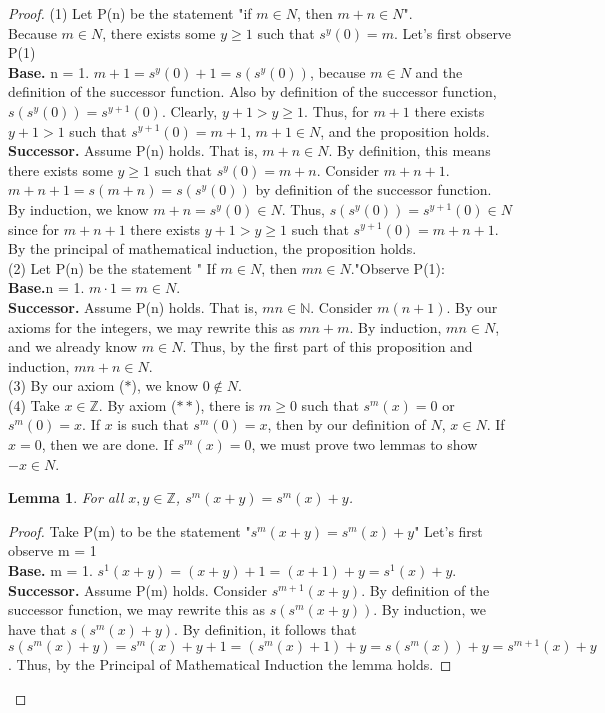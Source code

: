 \documentclass[12pt]{amsart}
\newcommand{\N}{\mathbb{N}}
\newcommand{\Z}{\mathbb{Z}}
\begin{document}
\begin{proof}
	(1) Let P(n) be the statement "if $m \in N$, then $m + n \in N$".\\Because $m \in N$, there exists some $y \geq 1$ such that $ s^y(0) = m$. Let's first observe P(1)
	\\\textbf{Base.} n = 1. $m + 1 = s^y(0) + 1 = s(s^y(0))$, because $m \in N$ and the definition of the successor function. Also by definition of the successor function, $s(s^y(0)) = s^{y+1}(0)$. Clearly, $y+1 > y \geq 1$. Thus, for $m+1$ there exists $y+1 > 1$ such that $s^{y+1}(0) = m+1$, $m+1 \in N$, and the proposition holds.
	\\\textbf{Successor.} Assume P(n) holds. That is, $m + n \in N$. By definition, this means there exists some $y \geq 1$ such that $s^y(0) = m+n$. Consider $m + n + 1$. $m + n + 1 = s(m + n) = s(s^y(0))$ by definition of the successor function. By induction, we know $m + n = s^y(0) \in N$. Thus, $s(s^{y}(0)) = s^{y+1}(0) \in N$ since for $m + n + 1$ there exists $y + 1 > y \geq 1$ such that $s^{y+1}(0) = m + n + 1$. By the principal of mathematical induction, the proposition holds.
	\\\indent (2) Let P(n) be the statement " If $m \in N$, then $mn \in N$."Observe P(1):
	\\\textbf{Base.}n = 1. $m \cdot 1 = m \in N$.
	\\\textbf{Successor.} Assume P(n) holds. That is, $mn \in \N$. Consider $m(n+1)$. By our axioms for the integers, we may rewrite this as $mn + m$. By induction, $mn \in N$, and we already know $m \in N$. Thus, by the first part of this proposition and induction, $mn + n \in N$.
	\\\indent (3) By our axiom ($\ast$), we know $0 \notin N$.
	\\\indent (4) Take $x \in \Z$. By axiom ($\ast\ast$), there is $m \geq 0$ such that $s^m(x) = 0$ or $s^m(0) = x$. If $x$ is such that $s^m(0) = x$, then by our definition of $N$, $x \in N$. If $x = 0$, then we are done. If $s^m(x) = 0$, we must prove two lemmas to show $-x \in N$.
	\newtheorem*{lemma1}{Lemma}
	\begin{lemma1}
		For all $x,y \in \Z$, $s^m(x+y) = s^m(x) + y$.
	\end{lemma1}
	\begin{proof}
		Take P(m) to be the statement "$s^m(x+y) = s^m(x) + y$" Let's first observe m = 1
		\\\textbf{Base.} m = 1. $s^1(x+y) = (x + y) + 1 = (x + 1) + y = s^1(x) + y$.
		\\\textbf{Successor.} Assume P(m) holds. Consider $s^{m+1}(x+y)$. By definition of the successor function, we may rewrite this as $s(s^{m}(x+y))$. By induction, we have that $s(s^m(x) + y)$. By definition, it follows that $s(s^m(x) + y) = s^m(x) + y + 1 = (s^m(x) + 1) + y = s(s^m(x)) + y = s^{m+1}(x) + y$. Thus, by the Principal of Mathematical Induction the lemma holds. 

\end{proof}
\end{proof}
\end{document}
